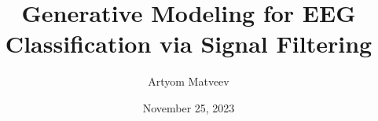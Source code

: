\documentclass{beamer}
\title[Week 10]{Generative Modeling for EEG Classification via Signal Filtering} %
\author{Artyom Matveev} %
\institute[MIPT] %
{
Moscow Institute of Physics and Technology \\ %
\medskip
\textit{matveev.as@phystech.edu} %
}
\date{November 25, 2023} %
\begin{document}
{
\begin{frame}
\titlepage %
\end{frame}
}



%
\end{document}
